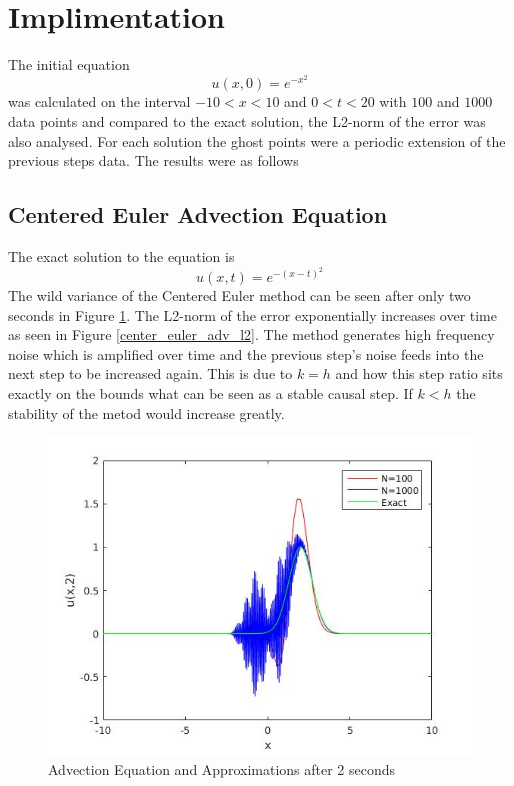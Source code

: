\section{Implimentation}
The initial equation
\begin{equation}
  u(x,0) = e^{-x^2}
\end{equation}
was calculated on the interval $-10<x<10$ and $0<t<20$ with $100$ and $1000$ data points and compared to the exact solution, the L2-norm of the error was also analysed. For each solution the ghost points were a periodic extension of the previous steps data. The results were as follows
\subsection{Centered Euler Advection Equation}
The exact solution to the equation is
\begin{equation}
u(x,t) = e^{-(x-t)^2}
\end{equation}
The wild variance of the Centered Euler method can be seen after only two seconds in Figure \ref{center_euler_adv}. The L2-norm of the error exponentially increases over time as seen in Figure \ref{center_euler_adv_l2}. The method generates high frequency noise which is amplified over time and the previous step's noise feeds into the next step to be increased again. This is due to $k=h$ and how this step ratio sits exactly on the bounds what can be seen as a stable causal step. If $k<h$ the stability of the metod would increase greatly.
\begin{figure}[H] 
 \centering
 \includegraphics[scale=0.5]{Images/center_euler_adv.jpg}
 \caption{Advection Equation and Approximations after 2 seconds}
 \label{center_euler_adv}
\end{figure}
